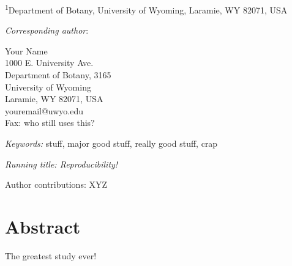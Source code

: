 \documentclass[letterpaper, 12pt]{article}
\begin{document}

\medskip


\bigskip   

\noindent \parbox[t]{6.5in}{\textsuperscript{1}Department of Botany, University of
  Wyoming, Laramie, WY 82071, USA}

\vspace{2in}

\noindent \emph{Corresponding author}: \parbox[t]{4in}{Your Name\\
  1000 E. University Ave.\\
  Department of Botany, 3165\\
  University of Wyoming\\
  Laramie, WY 82071, USA\\
  youremail@uwyo.edu\\
  Fax: who still uses this?
}

\bigskip

\noindent 
\emph{Keywords:} stuff, major good stuff, really good stuff, crap

\bigskip
\noindent \emph{Running title: Reproducibility!}

\bigskip

\noindent Author contributions: XYZ
\newpage


\section*{Abstract}
The greatest study ever!
\end{document}
